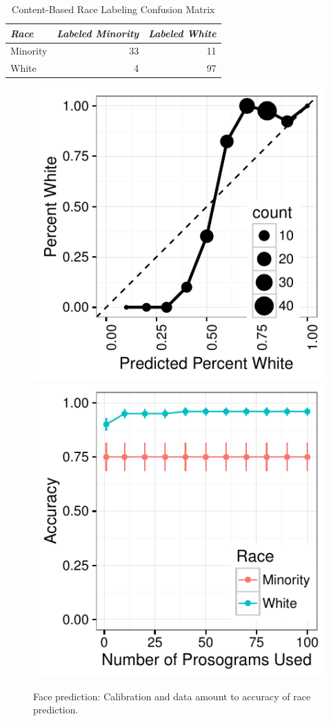 
\begin{table}[h]
\centering
\begin{tabular}{l r r}
\emph{Race} & \emph{Labeled Minority} & \emph{Labeled White} \\ \hline
Minority & 33 & 11 \\
White & 4 & 97 \\
\end{tabular}
\caption{Content-Based Race Labeling Confusion Matrix\label{tab:cm_race_face}}
\end{table}

\begin{figure}
  \centering
    \includegraphics[width=0.48\linewidth]{fig/census/calibration_race_face-eps-converted-to.pdf}
    \includegraphics[width=0.48\linewidth]{fig/census/faces_v_accuracy_race_labeled-eps-converted-to.pdf}
  \caption{Face prediction: Calibration and data amount to accuracy of race prediction.\label{fig:accuracy_race_face}}
\end{figure}

